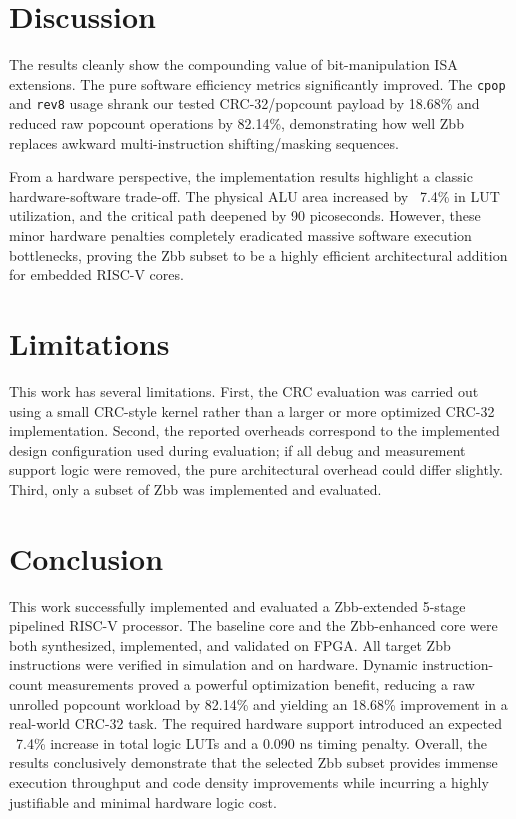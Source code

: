 \documentclass[conference]{IEEEtran}
\begin{document}
	\section{Discussion}
	The results cleanly show the compounding value of bit-manipulation ISA extensions. The pure software efficiency metrics significantly improved. The \texttt{cpop} and \texttt{rev8} usage shrank our tested CRC-32/popcount payload by 18.68\% and reduced raw popcount operations by 82.14\%, demonstrating how well Zbb replaces awkward multi-instruction shifting/masking sequences.
	
	From a hardware perspective, the implementation results highlight a classic hardware-software trade-off. The physical ALU area increased by ~7.4\% in LUT utilization, and the critical path deepened by 90 picoseconds. However, these minor hardware penalties completely eradicated massive software execution bottlenecks, proving the Zbb subset to be a highly efficient architectural addition for embedded RISC-V cores.
	
	\section{Limitations}
	This work has several limitations. First, the CRC evaluation was carried out using a small CRC-style kernel rather than a larger or more optimized CRC-32 implementation. Second, the reported overheads correspond to the implemented design configuration used during evaluation; if all debug and measurement support logic were removed, the pure architectural overhead could differ slightly. Third, only a subset of Zbb was implemented and evaluated.
	
	\section{Conclusion}
	This work successfully implemented and evaluated a Zbb-extended 5-stage pipelined RISC-V processor. The baseline core and the Zbb-enhanced core were both synthesized, implemented, and validated on FPGA. All target Zbb instructions were verified in simulation and on hardware. Dynamic instruction-count measurements proved a powerful optimization benefit, reducing a raw unrolled popcount workload by 82.14\% and yielding an 18.68\% improvement in a real-world CRC-32 task. The required hardware support introduced an expected ~7.4\% increase in total logic LUTs and a 0.090 ns timing penalty. Overall, the results conclusively demonstrate that the selected Zbb subset provides immense execution throughput and code density improvements while incurring a highly justifiable and minimal hardware logic cost.
	
\end{document}
